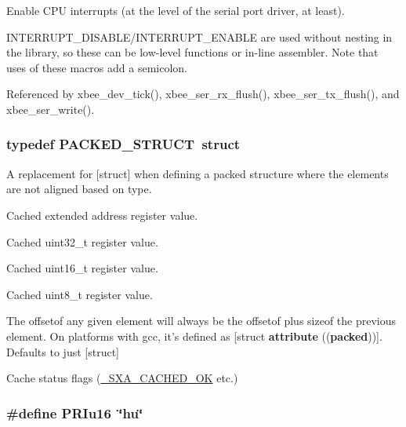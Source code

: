Enable C\-P\-U interrupts (at the level of the serial port driver, at least). 

I\-N\-T\-E\-R\-R\-U\-P\-T\-\_\-\-D\-I\-S\-A\-B\-L\-E/\-I\-N\-T\-E\-R\-R\-U\-P\-T\-\_\-\-E\-N\-A\-B\-L\-E are used without nesting in the library, so these can be low-\/level functions or in-\/line assembler. Note that uses of these macros add a semicolon. 

Referenced by xbee\-\_\-dev\-\_\-tick(), xbee\-\_\-ser\-\_\-rx\-\_\-flush(), xbee\-\_\-ser\-\_\-tx\-\_\-flush(), and xbee\-\_\-ser\-\_\-write().

\hypertarget{group__hal_ga4233297bd31be5c273d4fb0758cc54d7}{
\subsubsection[{P\-A\-C\-K\-E\-D\-\_\-\-S\-T\-R\-U\-C\-T}]{\setlength{\rightskip}{0pt plus 5cm}typedef P\-A\-C\-K\-E\-D\-\_\-\-S\-T\-R\-U\-C\-T~struct}}\label{group__hal_ga4233297bd31be5c273d4fb0758cc54d7}


A replacement for \mbox{[}struct\mbox{]} when defining a packed structure where the elements are not aligned based on type. 

Cached extended address register value.

Cached uint32\-\_\-t register value.

Cached uint16\-\_\-t register value.

Cached uint8\-\_\-t register value.

The offsetof any given element will always be the offsetof plus sizeof the previous element. On platforms with gcc, it's defined as \mbox{[}struct {\bfseries attribute} (({\bfseries packed}))\mbox{]}. Defaults to just \mbox{[}struct\mbox{]}

Cache status flags (\hyperlink{group___s_x_a_gga0411cd49bb5b71852cecd93bcbf0ca2da54498f64b3ad7c2be423d32b45deac04}{\-\_\-\-S\-X\-A\-\_\-\-C\-A\-C\-H\-E\-D\-\_\-\-O\-K} etc.) \hypertarget{group__hal_ga86bc00ee87e8e40787e0681fc34c576a}{
\subsubsection[{P\-R\-Iu16}]{\setlength{\rightskip}{0pt plus 5cm}\#define P\-R\-Iu16~\char`\"{}hu\char`\"{}}}\label{group__hal_ga86bc00ee87e8e40787e0681fc34c576a}


